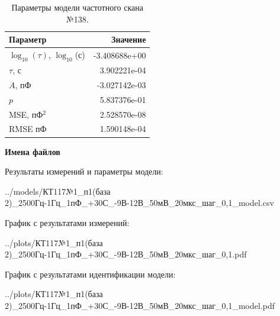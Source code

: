 \begin{table}[!ht]
    \centering
    \caption{Параметры модели частотного скана №138.}
    \begin{tabular}{|l|r|}
        \hline
        Параметр                                       & Значение                  \\ \hline
        $\log_{10}(\tau)$, $\log_{10}$(с)              & -3.408688e+00             \\ \hline
        $\tau$, с                                      & 3.902221e-04              \\ \hline
        $A$, пФ                                        & -3.027142e-03             \\ \hline
        $p$                                            & 5.837376e-01              \\ \hline
        MSE, пФ$^2$                                    & 2.528570e-08              \\ \hline
        RMSE пФ                                        & 1.590148e-04              \\ \hline
    \end{tabular}
    \label{table:frequency_scan_model_138}
\end{table}

\textbf{Имена файлов}

Результаты измерений и параметры модели:

\scriptsize../models/КТ117№1\_п1(база 2)\_2500Гц-1Гц\_1пФ\_+30С\_-9В-12В\_50мВ\_20мкс\_шаг\_0,1\_model.csv
\normalsize

График с результатами измерений:

\scriptsize../plots/КТ117№1\_п1(база 2)\_2500Гц-1Гц\_1пФ\_+30С\_-9В-12В\_50мВ\_20мкс\_шаг\_0,1.pdf
\normalsize

График с результатами идентификации модели:

\scriptsize../plots/КТ117№1\_п1(база 2)\_2500Гц-1Гц\_1пФ\_+30С\_-9В-12В\_50мВ\_20мкс\_шаг\_0,1\_model.pdf
\normalsize

